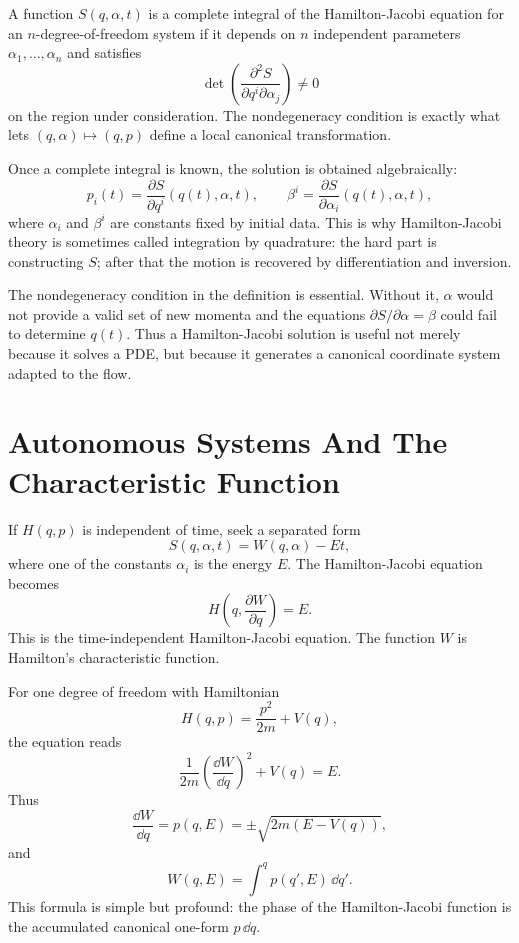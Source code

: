 \begin{definition}
A function \(S(q,\alpha,t)\) is a complete integral of the Hamilton-Jacobi
equation for an \(n\)-degree-of-freedom system if it depends on \(n\) independent
parameters \(\alpha_1,\ldots,\alpha_n\) and satisfies
\[
  \det\left(
    \frac{\partial^2S}{\partial q^i\partial\alpha_j}
  \right)\neq0
\]
on the region under consideration. The nondegeneracy condition is exactly what
lets \((q,\alpha)\mapsto(q,p)\) define a local canonical transformation.
\end{definition}

Once a complete integral is known, the solution is obtained algebraically:
\[
  p_i(t)=\frac{\partial S}{\partial q^i}(q(t),\alpha,t),
  \qquad
  \beta^i=\frac{\partial S}{\partial\alpha_i}(q(t),\alpha,t),
\]
where \(\alpha_i\) and \(\beta^i\) are constants fixed by initial data. This is
why Hamilton-Jacobi theory is sometimes called integration by quadrature: the
hard part is constructing \(S\); after that the motion is recovered by
differentiation and inversion.

The nondegeneracy condition in the definition is essential. Without it,
\(\alpha\) would not provide a valid set of new momenta and the equations
\(\partial S/\partial\alpha=\beta\) could fail to determine \(q(t)\). Thus a
Hamilton-Jacobi solution is useful not merely because it solves a PDE, but
because it generates a canonical coordinate system adapted to the flow.

\section{Autonomous Systems And The Characteristic Function}
\label{sec:hj-autonomous}

If \(H(q,p)\) is independent of time, seek a separated form
\[
  S(q,\alpha,t)=W(q,\alpha)-Et,
\]
where one of the constants \(\alpha_i\) is the energy \(E\). The
Hamilton-Jacobi equation becomes
\[
  \boxed{
  H\!\left(q,\frac{\partial W}{\partial q}\right)=E.
  }
\]
This is the time-independent Hamilton-Jacobi equation. The function \(W\) is
Hamilton's characteristic function.

For one degree of freedom with Hamiltonian
\[
  H(q,p)=\frac{p^2}{2m}+V(q),
\]
the equation reads
\[
  \frac1{2m}\left(\frac{\dd W}{\dd q}\right)^2+V(q)=E.
\]
Thus
\[
  \frac{\dd W}{\dd q}=p(q,E)=\pm\sqrt{2m(E-V(q))},
\]
and
\[
  W(q,E)=\int^q p(q',E)\,\dd q'.
\]
This formula is simple but profound: the phase of the Hamilton-Jacobi function
is the accumulated canonical one-form \(p\,\dd q\).

